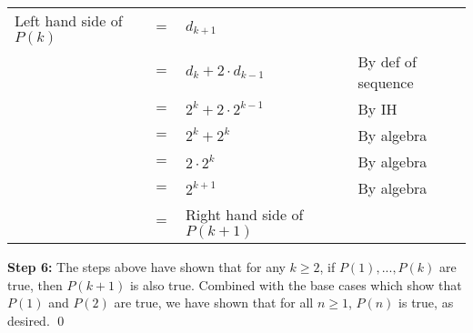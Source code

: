 \documentclass{article}
\begin{document}
\begin{adjustwidth}{-0.25cm}{}
	\noindent
	\hspace{-3cm}
	\begin{sloppypar}
		\begin{tabular}{l l l l}
			Left hand side of $P(k)$ & $=$ & $d_{k+1}$ & \\
									 & $=$ & $d_{k}+2\cdot d_{k-1}$ & By def of sequence \\
									 & $=$ & $2^k+2\cdot 2^{k-1}$ & By IH \\
									 & $=$ & $2^k+2^k$ & By algebra \\
									 & $=$ & $2\cdot 2^k$ & By algebra \\
									 & $=$ & $2^{k+1}$ & By algebra \\
									 & $=$ & Right hand side of $P(k+1)$ & \\
		\end{tabular}
	\end{sloppypar}
	
\end{adjustwidth}
\vspace{15pt}

\noindent\textbf{Step 6:} The steps above have shown that for any $k\geq 2$, if $P(1),...,P(k)$ are true, then $P(k+1)$ is also true. Combined with the base cases which show that $P(1)$ and $P(2)$ are true, we have shown that for all $n\geq 1$, $P(n)$ is true, as desired. \qed
\end{document}
